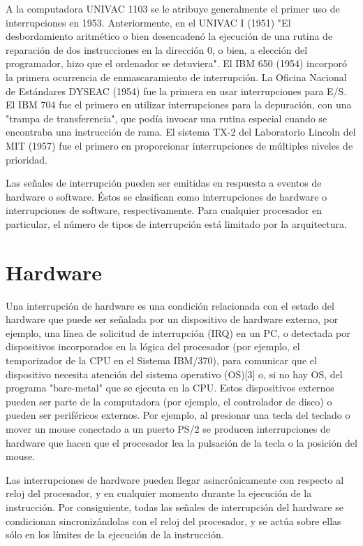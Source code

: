\documentclass{article}
\begin{document}
A la computadora UNIVAC 1103 se le atribuye generalmente el primer uso de interrupciones en 1953. Anteriormente, en el UNIVAC I (1951) "El desbordamiento aritmético o bien desencadenó la ejecución de una rutina de reparación de dos instrucciones en la dirección 0, o bien, a elección del programador, hizo que el ordenador se detuviera". El IBM 650 (1954) incorporó la primera ocurrencia de enmascaramiento de interrupción. La Oficina Nacional de Estándares DYSEAC (1954) fue la primera en usar interrupciones para E/S. El IBM 704 fue el primero en utilizar interrupciones para la depuración, con una "trampa de transferencia", que podía invocar una rutina especial cuando se encontraba una instrucción de rama. El sistema TX-2 del Laboratorio Lincoln del MIT (1957) fue el primero en proporcionar interrupciones de múltiples niveles de prioridad.


\vspace{4mm}

Las señales de interrupción pueden ser emitidas en respuesta a eventos de hardware o software. Éstos se clasifican como interrupciones de hardware o interrupciones de software, respectivamente. Para cualquier procesador en particular, el número de tipos de interrupción está limitado por la arquitectura.


\section{Hardware}

Una interrupción de hardware es una condición relacionada con el estado del hardware que puede ser señalada por un dispositivo de hardware externo, por ejemplo, una línea de solicitud de interrupción (IRQ) en un PC, o detectada por dispositivos incorporados en la lógica del procesador (por ejemplo, el temporizador de la CPU en el Sistema IBM/370), para comunicar que el dispositivo necesita atención del sistema operativo (OS)[3] o, si no hay OS, del programa "bare-metal" que se ejecuta en la CPU. Estos dispositivos externos pueden ser parte de la computadora (por ejemplo, el controlador de disco) o pueden ser periféricos externos. Por ejemplo, al presionar una tecla del teclado o mover un mouse conectado a un puerto PS/2 se producen interrupciones de hardware que hacen que el procesador lea la pulsación de la tecla o la posición del mouse.

Las interrupciones de hardware pueden llegar asincrónicamente con respecto al reloj del procesador, y en cualquier momento durante la ejecución de la instrucción. Por consiguiente, todas las señales de interrupción del hardware se condicionan sincronizándolas con el reloj del procesador, y se actúa sobre ellas sólo en los límites de la ejecución de la instrucción.
\end{document}
